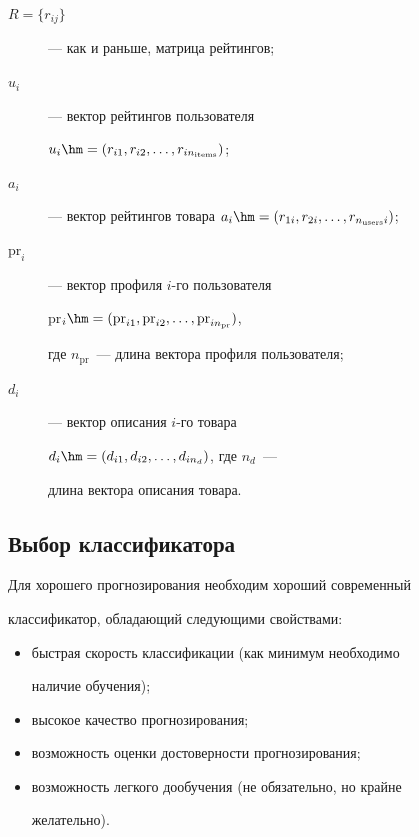 \begin{description} %


    \item[$R=\{r_{ij}\}$] --- как и раньше, матрица рейтингов;


\item[$u_i$] --- вектор рейтингов пользователя


$u_i\hm=(r_{i1},r_{i2},\ldots,r_{i\nit})$; 


\item[$a_i$] --- вектор рейтингов товара $a_i\hm=(r_{1i},r_{2i},\ldots,r_{\nus i})$;


\item[$\mathrm{pr}_i$] --- вектор профиля $i$-го пользователя


pr$_i\hm=(\mathrm{pr}_{i1},\mathrm{pr}_{i2},\ldots,\mathrm{pr}_{in_{\mathrm{pr}}})$, 


где $n_{\mathrm{pr}}$~--- длина вектора профиля пользователя;


\item[$d_i$] --- вектор описания $i$-го товара 


$d_i\hm=(d_{i1},d_{i2},\ldots,d_{in_d})$, где $n_d$~---


длина вектора описания товара.


\end{description}





\subsection{Выбор классификатора}





Для хорошего прогнозирования необходим хороший современный


классификатор, обладающий следующими свойствами:


\begin{itemize}


\item быстрая скорость классификации (как минимум необходимо


наличие обучения); 


\item высокое качество прогнозирования; 


\item возможность оценки достоверности прогнозирования; 


\item возможность легкого дообучения (не обязательно, но крайне


желательно).


\end{itemize} 


